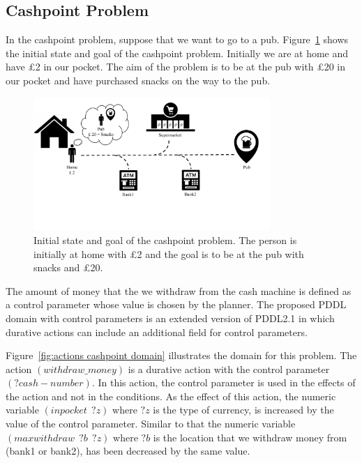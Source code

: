 \subsection{Cashpoint Problem}

In the cashpoint problem, suppose that we want to go to a pub. Figure~\ref{fig:cashpoint} shows the initial state and goal of the cashpoint problem. Initially we are at home and have \pounds2 in our pocket. The aim of the problem is to be at the pub with \pounds20 in our pocket and have purchased snacks on the way to the pub.

\begin{figure}[!ht]
\centering
\includegraphics[width=0.80\textwidth]{diagrams/cashpoint.pdf}
\caption{Initial state and goal of the cashpoint problem. The person is initially at home with \pounds2 and the goal is to be at the pub with snacks and \pounds20.}
\label{fig:cashpoint}
\end{figure}

The amount of money that the we withdraw from the cash machine is defined as a control parameter whose value is chosen by the planner. The proposed PDDL domain with control parameters is an extended version of PDDL2.1 in which durative actions can include an additional field for control parameters.

Figure~\ref{fig:actions cashpoint domain} illustrates the domain for this problem. The action $(withdraw\_money)$ is a durative action with the control parameter $(?cash - number)$. In this action, the control parameter is used in the effects of the action and not in the conditions. As the effect of this action, the numeric variable $(inpocket \ \ ?z)$ where $?z$ is the type of currency, is increased by the value of the control parameter. Similar to that the numeric variable $(maxwithdraw \ \ ?b \ \ ?z)$ where $?b$ is the location that we withdraw money from (bank1 or bank2), has been decreased by the same value.

